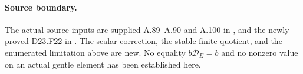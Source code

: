 \paragraph{Source boundary.}
The actual-source inputs are supplied A.89--A.90 and A.100 in
, and the newly proved
D23.F22 in
.
The scalar correction, the stable finite quotient, and the
enumerated limitation above are new. No equality
$b\mathcal D_E=b$ and no nonzero value on an actual gentle
element has been established here.
